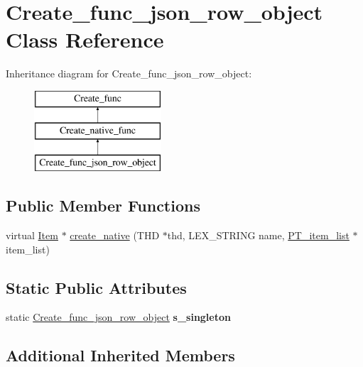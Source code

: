\hypertarget{classCreate__func__json__row__object}{}\section{Create\+\_\+func\+\_\+json\+\_\+row\+\_\+object Class Reference}
\label{classCreate__func__json__row__object}
Inheritance diagram for Create\+\_\+func\+\_\+json\+\_\+row\+\_\+object\+:\begin{figure}[H]
\begin{center}
\leavevmode
\includegraphics[height=3.000000cm]{classCreate__func__json__row__object}
\end{center}
\end{figure}
\subsection*{Public Member Functions}
\begin{DoxyCompactItemize}
\item 
virtual \mbox{\hyperlink{classItem}{Item}} $\ast$ \mbox{\hyperlink{classCreate__func__json__row__object_a96c8a889c0f044d6c09ea7bf1ba590e9}{create\+\_\+native}} (T\+HD $\ast$thd, L\+E\+X\+\_\+\+S\+T\+R\+I\+NG name, \mbox{\hyperlink{classPT__item__list}{P\+T\+\_\+item\+\_\+list}} $\ast$item\+\_\+list)
\end{DoxyCompactItemize}
\subsection*{Static Public Attributes}
\begin{DoxyCompactItemize}
\item 
\mbox{\label{classCreate__func__json__row__object_a0f02b5167a328981613f1947f99459ed}} 
static \mbox{\hyperlink{classCreate__func__json__row__object}{Create\+\_\+func\+\_\+json\+\_\+row\+\_\+object}} {\bfseries s\+\_\+singleton}
\end{DoxyCompactItemize}
\subsection*{Additional Inherited Members}



